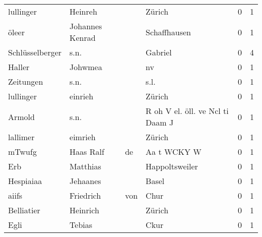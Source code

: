 \begin{tabular}{llllrr}
                lullinger &                            Heinreh &             &                                      Zürich &          0 &         1 \\
                    öleer &                    Johannes Kenrad &             &                                Schaffhausen &          0 &         1 \\
          Schlüsselberger &                               s.n. &             &                                     Gabriel &          0 &         4 \\
                   Haller &                            Johwmea &             &                                          nv &          0 &         1 \\
                Zeitungen &                               s.n. &             &                                        s.l. &          0 &         1 \\
                lullinger &                            einrieh &             &                                      Zürich &          0 &         1 \\
                   Armold &                               s.n. &             &            R oh V el. öll. ve Ncl ti Daam J &          0 &         1 \\
                 lallimer &                            eimrieh &             &                                      Zürich &          0 &         1 \\
                   mTwufg &                          Haas Ralf &          de &                                 Aa t WCKY W &          0 &         1 \\
                      Erb &                           Matthias &             &                              Happoltsweiler &          0 &         1 \\
                Hespiaiaa &                           Jehaanes &             &                                       Basel &          0 &         1 \\
                    aiifs &                          Friedrich &         von &                                        Chur &          0 &         1 \\
               Belliatier &                           Heinrich &             &                                      Zürich &          0 &         1 \\
                     Egli &                             Tebias &             &                                        Ckur &          0 &         1 \\

\end{tabular}
